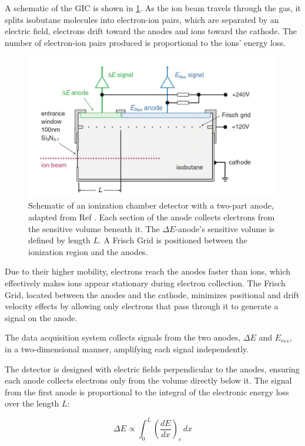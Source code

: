 A schematic of the GIC is shown in \cref{fig:GICdrawing}. As the ion beam travels through the gas, it splits isobutane molecules into electron-ion pairs, which are separated by an electric field, electrons drift toward the anodes and ions toward the cathode. The number of electron-ion pairs produced is proportional to the ions' energy loss.

\begin{figure}[ht]
    \centering
    \includegraphics[width=1\linewidth]{B/GICdrawing.pdf}
    \caption{Schematic of an ionization chamber detector with a two-part anode, adapted from Ref \cite{steinhof2016}. Each section of the anode collects electrons from the sensitive volume beneath it. The $\Delta E$-anode's sensitive volume is defined by length \( L \). A Frisch Grid is positioned between the ionization region and the anodes.}
    \label{fig:GICdrawing}
\end{figure}

Due to their higher mobility, electrons reach the anodes faster than ions, which effectively makes ions appear stationary during electron collection. The Frisch Grid, located between the anodes and the cathode, minimizes positional and drift velocity effects by allowing only electrons that pass through it to generate a signal on the anode.

The data acquisition system collects signals from the two anodes, $\Delta E$ and $E_{res}$, in a two-dimensional manner, amplifying each signal independently.

The detector is designed with electric fields perpendicular to the anodes, ensuring each anode collects electrons only from the volume directly below it. The signal from the first anode is proportional to the integral of the electronic energy loss over the length \( L \):

\begin{equation}
    \Delta E \propto \int_0^L \left( \frac{dE}{dx} \right)_e \, dx
\end{equation}

